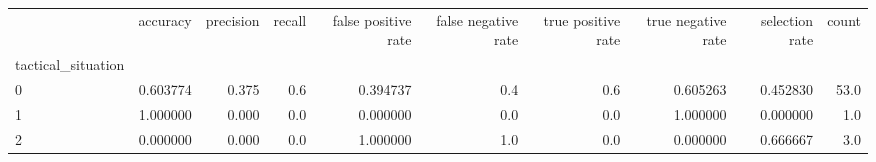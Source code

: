 \begin{tabular}{lrrrrrrrrr}
\toprule
{} &  accuracy &  precision &  recall &  false positive rate &  false negative rate &  true positive rate &  true negative rate &  selection rate &  count \\
tactical\_situation &           &            &         &                      &                      &                     &                     &                 &        \\
\midrule
0                  &  0.603774 &      0.375 &     0.6 &             0.394737 &                  0.4 &                 0.6 &            0.605263 &        0.452830 &   53.0 \\
1                  &  1.000000 &      0.000 &     0.0 &             0.000000 &                  0.0 &                 0.0 &            1.000000 &        0.000000 &    1.0 \\
2                  &  0.000000 &      0.000 &     0.0 &             1.000000 &                  1.0 &                 0.0 &            0.000000 &        0.666667 &    3.0 \\
\bottomrule
\end{tabular}
